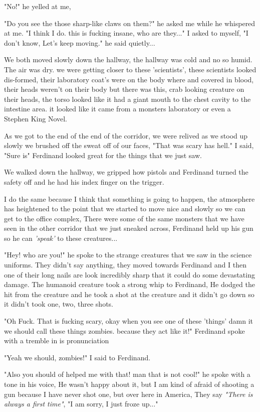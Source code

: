 \documentclass[14pt,letterpaper]{book}
\begin{document}
"No!" he yelled at me,


"Do you see the those sharp-like claws on them?" he asked me while he whispered at me.
"I think I do. this is fucking insane, who are they..." I asked to myself,
"I don't know, Let's keep moving." he said quietly...


We both moved slowly down the hallway, the hallway was cold and no so humid. The air was dry. we were getting closer to these 'scientists', these scientists looked dis-formed, their laboratory coat's were on the body where and covered in blood, their heads weren't on their body but there was this, crab looking creature on their heads, the torso looked like it had a giant mouth to the chest cavity to the intestine area. it looked like it came from a monsters laboratory or even a Stephen King Novel.


As we got to the end of the end of the corridor, we were relived as we stood up slowly we brushed off the sweat off of our faces, "That was scary has hell." I said, "Sure is" Ferdinand looked great for the things that we just saw.


We walked down the hallway, we gripped how pistols and Ferdinand turned the safety off and he had his index finger on the trigger.

I do the same because I think that something is going to happen, the atmosphere has heightened to the point that we started to move nice and slowly so we can get to the office complex, There were some of the same monsters that we have seen in the other corridor that we just sneaked across, Ferdinand held up his gun so he can \textit{'speak'} to these creatures... 

"Hey! who are you!" he spoke to the strange creatures that we saw in the science uniforms.
They didn't say anything, they moved towards Ferdinand and I then one of their long nails are look incredibly sharp that it could do some devastating damage. The humanoid creature took a strong whip to Ferdinand, He dodged the hit from the creature and he took a shot at the creature and it didn't go down so it didn't took one, two, three shots.


"Oh Fuck. That is fucking scary, okay when you see one of these 'things' damn it we should call these things zombies. because they act like it!" Ferdinand spoke with a tremble in is pronunciation 


"Yeah we should, zombies!" I said to Ferdinand.


"Also you should of helped me with that! man that is not cool!" he spoke with a tone in his voice, He wasn't happy about it, but I am kind of afraid of shooting a gun because I have never shot one, but over here in America, They say \textit{"There is always a first time"}, "I am sorry, I just froze up..."
\end{document}
